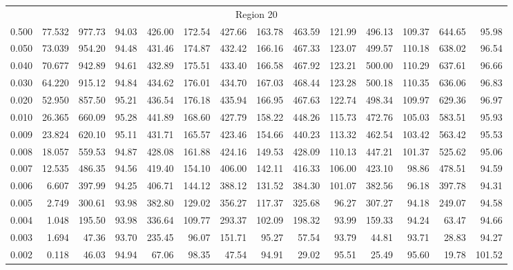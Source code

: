 \begin{tabular}{@{}lrrrrrrrrrrrrr@{}}
\midrule
\multicolumn{14}{c}{Region 20} \\
\cmidrule{1-14}
0.500 & 77.532 & 977.73 & 94.03 & 426.00 & 172.54 & 427.66 & 163.78 & 463.59 & 121.99 & 496.13 & 109.37 & 644.65 & 95.98 \\
0.050 & 73.039 & 954.20 & 94.48 & 431.46 & 174.87 & 432.42 & 166.16 & 467.33 & 123.07 & 499.57 & 110.18 & 638.02 & 96.54 \\
0.040 & 70.677 & 942.89 & 94.61 & 432.89 & 175.51 & 433.40 & 166.58 & 467.92 & 123.21 & 500.00 & 110.29 & 637.61 & 96.66 \\
0.030 & 64.220 & 915.12 & 94.84 & 434.62 & 176.01 & 434.70 & 167.03 & 468.44 & 123.28 & 500.18 & 110.35 & 636.06 & 96.83 \\
0.020 & 52.950 & 857.50 & 95.21 & 436.54 & 176.18 & 435.94 & 166.95 & 467.63 & 122.74 & 498.34 & 109.97 & 629.36 & 96.97 \\
0.010 & 26.365 & 660.09 & 95.28 & 441.89 & 168.60 & 427.79 & 158.22 & 448.26 & 115.73 & 472.76 & 105.03 & 583.51 & 95.93 \\
0.009 & 23.824 & 620.10 & 95.11 & 431.71 & 165.57 & 423.46 & 154.66 & 440.23 & 113.32 & 462.54 & 103.42 & 563.42 & 95.53 \\
0.008 & 18.057 & 559.53 & 94.87 & 428.08 & 161.88 & 424.16 & 149.53 & 428.09 & 110.13 & 447.21 & 101.37 & 525.62 & 95.06 \\
0.007 & 12.535 & 486.35 & 94.56 & 419.40 & 154.10 & 406.00 & 142.11 & 416.33 & 106.00 & 423.10 & 98.86 & 478.51 & 94.59 \\
0.006 & 6.607 & 397.99 & 94.25 & 406.71 & 144.12 & 388.12 & 131.52 & 384.30 & 101.07 & 382.56 & 96.18 & 397.78 & 94.31 \\
0.005 & 2.749 & 300.61 & 93.98 & 382.80 & 129.02 & 356.27 & 117.37 & 325.68 & 96.27 & 307.27 & 94.18 & 249.07 & 94.58 \\
0.004 & 1.048 & 195.50 & 93.98 & 336.64 & 109.77 & 293.37 & 102.09 & 198.32 & 93.99 & 159.33 & 94.24 & 63.47 & 94.66 \\
0.003 & 1.694 & 47.36 & 93.70 & 235.45 & 96.07 & 151.71 & 95.27 & 57.54 & 93.79 & 44.81 & 93.71 & 28.83 & 94.27 \\
0.002 & 0.118 & 46.03 & 94.94 & 67.06 & 98.35 & 47.54 & 94.91 & 29.02 & 95.51 & 25.49 & 95.60 & 19.78 & 101.52 \\

\bottomrule
\end{tabular}
